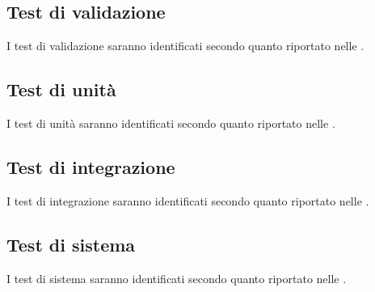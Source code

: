 \documentclass[PianoDiQualifica.tex]{subfiles}
\begin{document}
	\subsection{Test di validazione}
		I test di validazione saranno identificati secondo quanto riportato nelle \NPdocRP{}.
	
	\subsection{Test di unità}
		I test di unità saranno identificati secondo quanto riportato nelle \NPdocRP{}.
	
	\subsection{Test di integrazione}
		I test di integrazione saranno identificati secondo quanto riportato nelle \NPdocRP{}.
	
	\subsection{Test di sistema}
		I test di sistema saranno identificati secondo quanto riportato nelle \NPdocRP{}.
\end{document}
